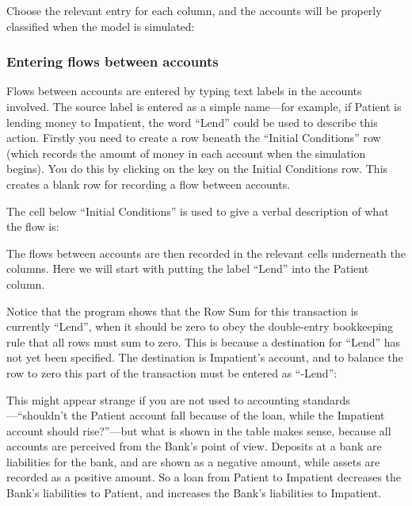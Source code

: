 Choose the relevant entry for each column, and the accounts will be properly classified when the model is simulated:


\subsubsection{Entering flows between accounts}


Flows between accounts are entered by typing text labels in the
accounts involved. The source label is entered as a simple name---for
example, if Patient is lending money to Impatient, the word ``Lend''
could be used to describe this action. Firstly you need to create a
row beneath the ``Initial Conditions'' row (which records the amount of
money in each account when the simulation begins). You do this by
clicking on the  key on the Initial Conditions row. This creates a
blank row for recording a flow between accounts.


The cell below ``Initial Conditions'' is used to give a verbal
description of what the flow is: 


The flows between accounts are then recorded in the relevant cells
underneath the columns. Here we will start with putting the label
``Lend'' into the Patient column. 


Notice that the program shows that the Row Sum for this transaction is
currently ``Lend'', when it should be zero to obey the double-entry
bookkeeping rule that all rows must sum to zero. This is because a
destination for ``Lend'' has not yet been specified. The destination
is Impatient's account, and to balance the row to zero this part of
the transaction must be entered as ``-Lend'': 


This might appear strange if you are not used to accounting
standards---``shouldn't the Patient account fall because of the loan,
while the Impatient account should rise?''---but what is shown in the
table makes sense, because all accounts are perceived from the Bank's
point of view. Deposits at a bank are liabilities for the bank, and
are shown as a negative amount, while assets are recorded as a
positive amount. So a loan from Patient to Impatient decreases the
Bank's liabilities to Patient, and increases the Bank's liabilities to
Impatient. 

